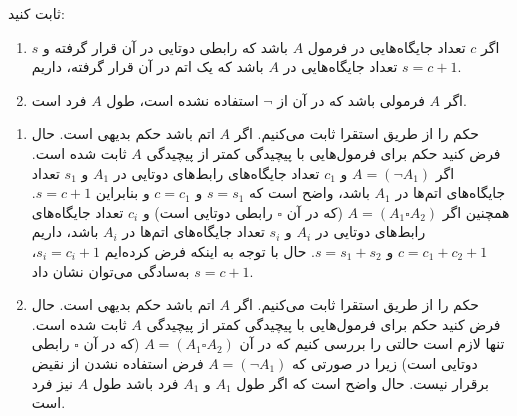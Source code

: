 ثابت کنید:
\begin{enumerate}
\item
اگر $c$ تعداد جایگاه‌هایی در فرمول $A$ باشد که رابطی دوتایی در آن قرار گرفته و $s$ تعداد جایگاه‌هایی در $A$ باشد که یک اتم در آن قرار گرفته، داریم $s=c+1$.
\item
اگر $A$ فرمولی باشد که در آن از $\neg$ استفاده نشده است، طول $A$ فرد است.
\end{enumerate}\quad\vspace{-9mm}
\begin{ans}
  \begin{enumerate}
    \item
    حکم را از طریق استقرا ثابت می‌کنیم. اگر $A$ اتم باشد حکم بدیهی است. حال فرض کنید حکم برای فرمول‌هایی با پیچیدگی کمتر از پیچیدگی $A$ ثابت شده است. اگر $A=(\neg A_1)$ و $c_1$ تعداد جایگاه‌های رابط‌های دوتایی در $A_1$ و $s_1$ تعداد جایگاه‌های اتم‌ها در $A_1$ باشد، واضح است که $s=s_1$ و $c=c_1$ و بنابراین $s=c+1$. همچنین اگر $A=(A_1\square A_2)$ (که در آن $\square$ رابطی دوتایی است) و $c_i$ تعداد جایگاه‌های رابط‌های دوتایی در $A_i$ و $s_i$ تعداد جایگاه‌های اتم‌ها در $A_i$ باشد، داریم $c=c_1+c_2+1$ و $s=s_1+s_2$. حال با توجه به اینکه فرض کرده‌ایم $s_i=c_i+1$، به‌سادگی می‌توان نشان داد $s=c+1$.
    
    
    \item
    حکم را از طریق استقرا ثابت می‌کنیم. اگر $A$ اتم باشد حکم بدیهی است. حال فرض کنید حکم برای فرمول‌هایی با پیچیدگی کمتر از پیچیدگی $A$ ثابت شده است. تنها لازم است حالتی را بررسی کنیم که در آن $A=(A_1\square A_2)$ (که در آن $\square$ رابطی دوتایی است) زیرا در صورتی که $A=(\neg A_1)$ فرض استفاده نشدن از نقیض برقرار نیست. حال واضح است که اگر طول $A_1$ و $A_1$ فرد باشد طول $A$ نیز فرد است.
    
  \end{enumerate}
\end{ans}
